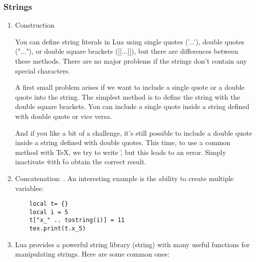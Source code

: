\subsubsection{Strings} %
\label{ssub:strings}

\begin{enumerate}[label=(\alph*)]
  \item Construction

 You can define string literals in Lua using single quotes ('...'), double quotes ("..."), or double square brackets ([[...]]), but there are differences between these methods. There are no major problems if the strings don't contain any special characters. 


A first small problem arises if we want to include a single quote or a double quote into the string. The simplest method is to define the string with the double square brackets. You can include a single quote inside a string defined with double quote or vice versa.

\begin{tkzexample}[latex=.4\textwidth]
\end{tkzexample}

And if you like a bit of a challenge, it's still possible to include a double quote inside a string defined with double quotes. This time, to use a common method with \TeX{}, we try to write \", but this leads to an error. Simply inactivate \" with \string\" to obtain the correct result.

\begin{tkzexample}[latex=.4\textwidth]
\end{tkzexample}



\item Concatenation: . An interesting example is the ability to create multiple variables:
\begin{mybox}
  \begin{verbatim}
    local t= {}
    local i = 5
    t["x_" .. tostring(i)] = 11
    tex.print(t.x_5)
  \end{verbatim}

\end{mybox}


\item Lua provides a powerful string library (string) with many useful functions for manipulating strings. Here are some common ones:


\end{enumerate}
